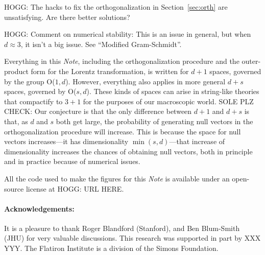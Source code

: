 \documentclass{article}
\newcommand{\plus}{\!+\!} %
\newcommand{\documentname}{\textsl{Note}}
\newcommand{\secref}[1]{Section~\ref{#1}}
\begin{document}
HOGG: The hacks to fix the orthogonalization in \secref{sec:orth} are unsatisfying. Are there better solutions?

HOGG: Comment on numerical stability: This is an issue in general, but when $d\approx 3$, it isn't a big issue. See ``Modified Gram-Schmidt''.

Everything in this \documentname{}, including the orthogonalization procedure and the outer-product form for the Lorentz transformation, is written for $d\plus1$ spaces, governed by the group O($1,d$).
However, everything also applies in more general $d\plus s$ spaces, governed by O($s,d$).
These kinds of spaces can arise in string-like theories that compactify to $3\plus 1$ for the purposes of our macroscopic world.
SOLE PLZ CHECK:
Our conjecture is that the only difference between $d\plus1$ and $d\plus s$ is that, as $d$ and $s$ both get large, the probability of generating null vectors in the orthogonalization procedure will increase.
This is because the space for null vectors increases---it has dimensionality $\min(s,d)$---that increase of dimensionality increases the chances of obtaining null vectors, both in principle and in practice because of numerical issues.

All the code used to make the figures for this \documentname{} is available under an open-source license at HOGG: URL HERE.

\paragraph{Acknowledgements:}
It is a pleasure to thank
  Roger Blandford (Stanford), and
  Ben Blum-Smith (JHU)
for very valuable discussions.
This research was supported in part by XXX YYY.
The Flatiron Institute is a division of the Simons Foundation.

\raggedright
\printbibliography
\end{document}
